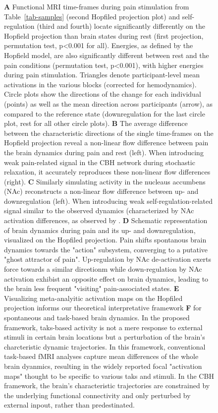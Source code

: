 \documentclass{article}
\begin{document}
\begin{figure}[!htbp]
{\textbf{A} Functional MRI time-frames during pain stimulation from Table~\ref{tab-samples} (second Hopfiled projection plot) and self-regulation (third and fourth) locate significantly differently on the Hopfield projection than brain states during rest (first projection, permutation test, p\textless 0.001 for all). Energies, as defined by the Hopfield model, are also significantly different between rest and the pain conditions (permutation test, p\textless 0.001), with higher energies during pain stimulation. Triangles denote participant-level mean activations in the various blocks (corrected for hemodynamics). Circle plots show the directions of the change for each individual (points) as well as the mean direction across participants (arrow), as compared to the reference state (downregulation for the last circle plot, rest for all other circle plots).
\textbf{B} The average difference between the characteristic directions of the single time-frames on the Hopfield projection reveal a non-linear flow difference between pain the brain dynamics during pain and rest (left). When introducing weak pain-related signal in the CBH network during stochastic relaxation, it accurately reproduces these non-linear flow differences (right).
\textbf{C} Similarly simulating activity in the nucleaus accumbens (NAc) reconstructs a non-linear flow difference between up- and downregulation (left). When introducing weak self-regulation-related signal similar to the observed dynamics (characterized by NAc activation differences, as observed by \href{https://doi.org/10.1371/journal.pbio.1002036}{}.
\textbf{D} Schematic representation of brain dynamics during pain and its up- and downregulation, visualized on the Hopfiled projection. Pain shifts spontanous brain dynamics towards the "action" subsystem, converging to a putative "ghost attractor of pain". Up-regulation by NAc de-activation exerts force towards a similar dircetionm while down-regulation by NAc activation exhibist an opposite effect on brain dynamics, leading to the brain less frequent "visiting" pain-associated states.
\textbf{E} Visualizing meta-analyitic activation maps on the Hopfiled projection informs our theoretical interpretative framework
\textbf{F}  for spontaneous and task-based brain dynamics. In the proposed framework, taks-based activity is not a mere response to external stimuli in certain brain locations but a perturbation of the brain's charcteristic dynamic trajectories. In this framework, conventional task-based fMRI analyses capture mean differences of the whole brain dyanmics, resulting in the widely reported focal "activation maps" thought to be specific to various taks and stimuli. In the CBH framework, the brain's characteristic trajectories are constrained by the underlying functional connectivity and only perturbed by external inpout, rather than predestinated.}
\label{task-validity}
\end{figure}
\end{document}
